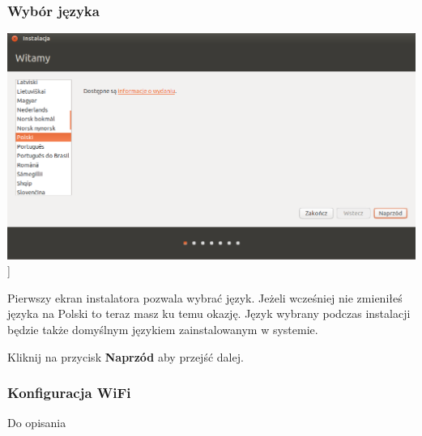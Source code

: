 \subsubsection{Wybór języka}
\begin{center}
        \includegraphics[scale=0.5]{images/instalator_jezyk.png}]
\end{center}
Pierwszy ekran instalatora pozwala wybrać język. Jeżeli wcześniej nie zmieniłeś języka na Polski to teraz masz ku temu okazję. Język wybrany podczas instalacji będzie także domyślnym językiem zainstalowanym w systemie.
\begin{flushright}
Kliknij na przycisk \textbf{Naprzód} aby przejść dalej.
\end{flushright}
\clearpage
\subsubsection{Konfiguracja WiFi}
Do opisania
\clearpage
